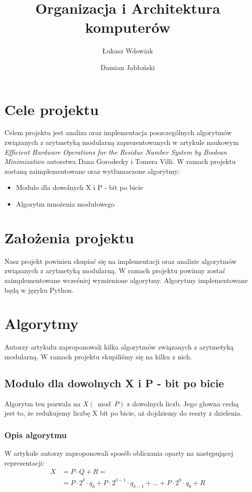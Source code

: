 \documentclass[11pt]{article}
\renewcommand\*{\cdot}
\begin{document}
\title{Organizacja i Architektura komputerów}
\author{Łukasz Wdowiak}
\author{Damian Jabłoński}


\tableofcontents

\newpage

\section{Cele projektu}
Celem projektu jest analiza oraz implementacja poszczególnych algorytmów związanych z arytmetyką modularną zaprezentowanych w artykule naukowym \textit{Efficient Hardware Operations for the Residue Number System by Boolean Minimization} autorstwa Dana Gorodecky i Tomera Villi. W ramach projektu zostaną zaimplementowane oraz wytłumaczone algorytmy:
\begin{itemize}
    \item Modulo dla dowolnych X i P - bit po bicie
    \item Algorytm mnożenia modułowego
\end{itemize}
\section{Założenia projektu}
Nasz projekt powinien skupiać się na implementacji oraz analizie algorytmów związanych z arytmetyką modularną. W ramach projektu powinny zostać zaimplementowane wcześniej wymienione algorytmy.
Algorytmy implementowane będą w języku Python.
\section{Algorytmy}
Autorzy artykułu zaproponowali kilka algorytmów związanych z arytmetyką modularną. W ramach projektu skupiliśmy się na kilku z nich.
\subsection{Modulo dla dowolnych X i P - bit po bicie}
Algorytm ten pozwala na  $X(\bmod P)$ z dowolnych liczb. Jego głowna cechą jest to, że redukujemy liczbę X bit po bicie, aż dojdziemy do reszty z dzielenia.
\subsubsection{Opis algorytmu}
W artykule autorzy zaproponowali sposób obliczania oparty na następującej reprezentacji:
\begin{align}
    X & =P \cdot Q+R=                                                                                           \\
      & =P \cdot 2^\delta \cdot q_\delta+P \cdot 2^{\delta-1} \cdot q_{\delta-1}+\ldots+P \cdot 2^0 \cdot q_0+R
\end{align}
\end{document}
